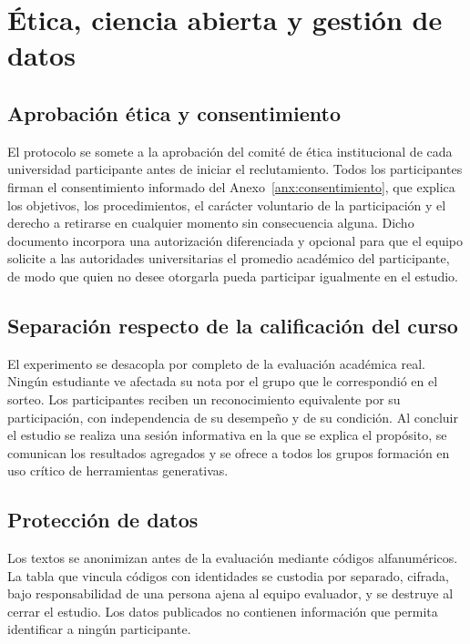 \documentclass[12pt,a4paper,openany]{report}
\begin{document}
    \chapter{\'Etica, ciencia abierta y gesti\'on de datos}
    
    \section{Aprobaci\'on \'etica y consentimiento}
    
    El protocolo se somete a la aprobaci\'on del comit\'e de \'etica institucional de cada universidad participante antes de iniciar el reclutamiento. Todos los participantes firman el consentimiento informado del Anexo~\ref{anx:consentimiento}, que explica los objetivos, los procedimientos, el car\'acter voluntario de la participaci\'on y el derecho a retirarse en cualquier momento sin consecuencia alguna. Dicho documento incorpora una autorizaci\'on diferenciada y opcional para que el equipo solicite a las autoridades universitarias el promedio acad\'emico del participante, de modo que quien no desee otorgarla pueda participar igualmente en el estudio.
    
    \section{Separaci\'on respecto de la calificaci\'on del curso}
    
    El experimento se desacopla por completo de la evaluaci\'on acad\'emica real. Ning\'un estudiante ve afectada su nota por el grupo que le correspondi\'o en el sorteo. Los participantes reciben un reconocimiento equivalente por su participaci\'on, con independencia de su desempe\~no y de su condici\'on. Al concluir el estudio se realiza una sesi\'on informativa en la que se explica el prop\'osito, se comunican los resultados agregados y se ofrece a todos los grupos formaci\'on en uso cr\'itico de herramientas generativas.
    
    \section{Protecci\'on de datos}
    
    Los textos se anonimizan antes de la evaluaci\'on mediante c\'odigos alfanum\'ericos. La tabla que vincula c\'odigos con identidades se custodia por separado, cifrada, bajo responsabilidad de una persona ajena al equipo evaluador, y se destruye al cerrar el estudio. Los datos publicados no contienen informaci\'on que permita identificar a ning\'un participante.
    
\end{document}
